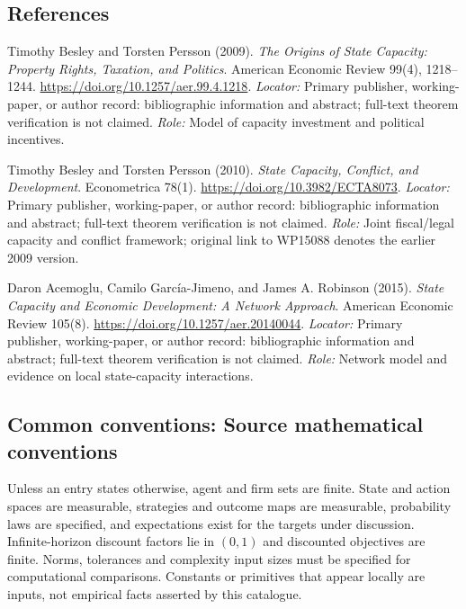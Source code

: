 \documentclass[11pt,a4paper]{article}
\begin{document}
\subsection*{References}
\begin{enumerate}[label=\textnormal{[S\arabic*]},leftmargin=*]
\item Timothy Besley and Torsten Persson (2009). \emph{The Origins of State Capacity: Property Rights, Taxation, and Politics}. American Economic Review 99(4), 1218--1244. \url{https://doi.org/10.1257/aer.99.4.1218}. \textit{Locator:} Primary publisher, working-paper, or author record: bibliographic information and abstract; full-text theorem verification is not claimed. \textit{Role:} Model of capacity investment and political incentives.
\item Timothy Besley and Torsten Persson (2010). \emph{State Capacity, Conflict, and Development}. Econometrica 78(1). \url{https://doi.org/10.3982/ECTA8073}. \textit{Locator:} Primary publisher, working-paper, or author record: bibliographic information and abstract; full-text theorem verification is not claimed. \textit{Role:} Joint fiscal/legal capacity and conflict framework; original link to WP15088 denotes the earlier 2009 version.
\item Daron Acemoglu, Camilo García-Jimeno, and James A. Robinson (2015). \emph{State Capacity and Economic Development: A Network Approach}. American Economic Review 105(8). \url{https://doi.org/10.1257/aer.20140044}. \textit{Locator:} Primary publisher, working-paper, or author record: bibliographic information and abstract; full-text theorem verification is not claimed. \textit{Role:} Network model and evidence on local state-capacity interactions.
\end{enumerate}

\subsection*{Common conventions: Source mathematical conventions}

Unless an entry states otherwise, agent and firm sets are finite. State and action spaces are measurable, strategies and outcome maps are measurable, probability laws are specified, and expectations exist for the targets under discussion. Infinite-horizon discount factors lie in $(0,1)$ and discounted objectives are finite. Norms, tolerances and complexity input sizes must be specified for computational comparisons. Constants or primitives that appear locally are inputs, not empirical facts asserted by this catalogue.
\end{document}
